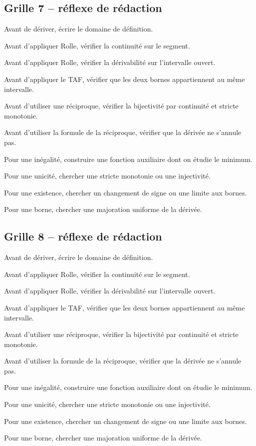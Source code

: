 \documentclass[11pt,a4paper]{article}
\begin{document}
\subsection*{Grille 7 -- réflexe de rédaction}

\begin{methodebox}

Avant de dériver, écrire le domaine de définition.

Avant d'appliquer Rolle, vérifier la continuité sur le segment.

Avant d'appliquer Rolle, vérifier la dérivabilité sur l'intervalle ouvert.

Avant d'appliquer le TAF, vérifier que les deux bornes appartiennent au même intervalle.

Avant d'utiliser une réciproque, vérifier la bijectivité par continuité et stricte monotonie.

Avant d'utiliser la formule de la réciproque, vérifier que la dérivée ne s'annule pas.

Pour une inégalité, construire une fonction auxiliaire dont on étudie le minimum.

Pour une unicité, chercher une stricte monotonie ou une injectivité.

Pour une existence, chercher un changement de signe ou une limite aux bornes.

Pour une borne, chercher une majoration uniforme de la dérivée.

\end{methodebox}

\subsection*{Grille 8 -- réflexe de rédaction}

\begin{methodebox}

Avant de dériver, écrire le domaine de définition.

Avant d'appliquer Rolle, vérifier la continuité sur le segment.

Avant d'appliquer Rolle, vérifier la dérivabilité sur l'intervalle ouvert.

Avant d'appliquer le TAF, vérifier que les deux bornes appartiennent au même intervalle.

Avant d'utiliser une réciproque, vérifier la bijectivité par continuité et stricte monotonie.

Avant d'utiliser la formule de la réciproque, vérifier que la dérivée ne s'annule pas.

Pour une inégalité, construire une fonction auxiliaire dont on étudie le minimum.

Pour une unicité, chercher une stricte monotonie ou une injectivité.

Pour une existence, chercher un changement de signe ou une limite aux bornes.

Pour une borne, chercher une majoration uniforme de la dérivée.

\end{methodebox}
\end{document}
